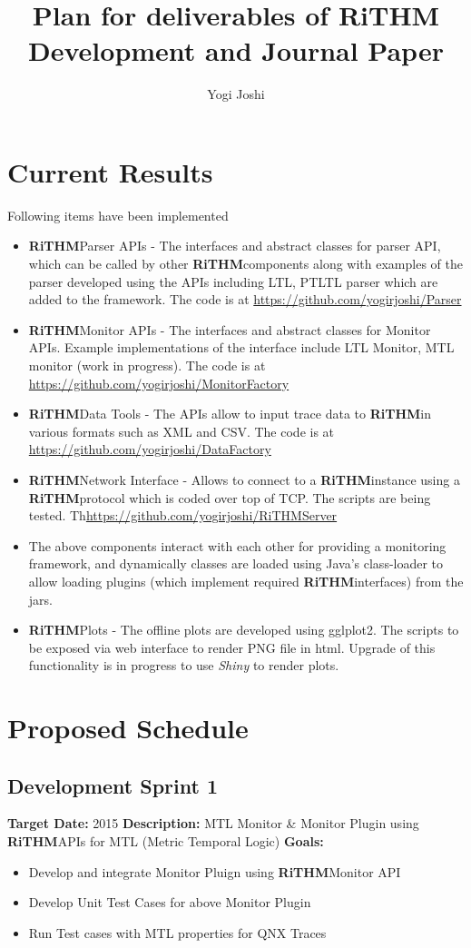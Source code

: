 \documentclass[]{article}
\title{ Plan for deliverables of \textbf{RiTHM} Development and Journal Paper}
\author{Yogi Joshi}
\newcommand{\rithm}{\textbf{RiTHM}\space}
\begin{document}
\maketitle

\section{Current Results}
Following items have been implemented
\begin{itemize}
	\item \rithm Parser APIs - The interfaces and abstract classes for parser API, which can be called by other \rithm components along with examples of the parser developed using the APIs  including LTL, PTLTL parser which are added to the framework. The code is at \url{https://github.com/yogirjoshi/Parser}
	\item \rithm Monitor APIs - The interfaces and abstract classes for Monitor APIs. Example implementations of the interface include LTL Monitor, MTL monitor (work in progress). The code is at \url{https://github.com/yogirjoshi/MonitorFactory}	
	\item \rithm Data Tools - The APIs allow to input trace data to \rithm in various formats such as XML and CSV. The code is at \url{https://github.com/yogirjoshi/DataFactory}
	\item \rithm Network Interface - Allows to connect to a \rithm instance using a \rithm protocol which is coded over top of TCP. The scripts are being tested. Th\url{https://github.com/yogirjoshi/RiTHMServer}
	\item The above components interact with each other for providing a monitoring framework, and dynamically classes are loaded using Java's class-loader to allow loading plugins (which implement required \rithm interfaces) from the jars. 
	\item \rithm Plots - The offline plots are developed using gglplot2. The scripts to be exposed via web interface to render PNG file in html. Upgrade of this functionality is in progress to use \textit{Shiny} to render plots.
\end{itemize}
\section{Proposed Schedule}
\subsection{Development Sprint 1}
\textbf{Target Date:}\space {} {2015}\newline
\textbf{Description:} MTL Monitor \& Monitor Plugin using \rithm APIs for MTL (Metric Temporal Logic)\newline
\textbf{Goals:}
\begin{itemize}
\item Develop and integrate Monitor Pluign using \rithm Monitor API
\item Develop Unit Test Cases for above Monitor Plugin
\item Run Test cases with MTL properties for QNX Traces\\
\end{itemize}
\end{document}
